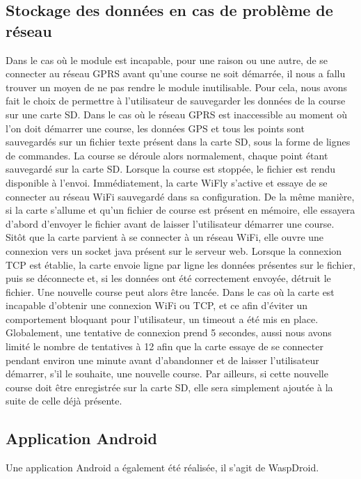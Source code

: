 \documentclass[a4paper,11pt]{article}
\begin{document}
\subsection{Stockage des données en cas de problème de réseau}
Dans le cas où le module est incapable, pour une raison ou une autre, de se connecter au réseau GPRS avant qu'une course ne soit démarrée, il nous a fallu trouver un moyen de ne pas rendre le module inutilisable. Pour cela, nous avons fait le choix de permettre à l'utilisateur de sauvegarder les données de la course sur une carte SD.\newline
Dans le cas où le réseau GPRS est inaccessible au moment où l'on doit démarrer une course, les données GPS et tous les points sont sauvegardés sur un fichier texte présent dans la carte SD, sous la forme de lignes de commandes. La course se déroule alors normalement, chaque point étant sauvegardé sur la carte SD.\newline
Lorsque la course est stoppée, le fichier est rendu disponible à l'envoi. Immédiatement, la carte WiFly s'active et essaye de se connecter au réseau WiFi sauvegardé dans sa configuration. De la même manière, si la carte s'allume et qu'un fichier de course est présent en mémoire, elle essayera d'abord d'envoyer le fichier avant de laisser l'utilisateur démarrer une course.\newline
Sitôt que la carte parvient à se connecter à un réseau WiFi, elle ouvre une connexion vers un socket java présent sur le serveur web. Lorsque la connexion TCP est établie, la carte envoie ligne par ligne les données présentes sur le fichier, puis se déconnecte et, si les données ont été correctement envoyée, détruit le fichier. Une nouvelle course peut alors être lancée.\newline
Dans le cas où la carte est incapable d'obtenir une connexion WiFi ou TCP, et ce afin d'éviter un comportement bloquant pour l'utilisateur, un timeout a été mis en place. Globalement, une tentative de connexion prend 5 secondes, aussi nous avons limité le nombre de tentatives à 12 afin que la carte essaye de se connecter pendant environ une minute avant d'abandonner et de laisser l'utilisateur démarrer, s'il le souhaite, une nouvelle course. Par ailleurs, si cette nouvelle course doit être enregistrée sur la carte SD, elle sera simplement ajoutée à la suite de celle déjà présente.\newline
\subsection{Application Android}
Une application Android a également été réalisée, il s'agit de WaspDroid.
\end{document}
